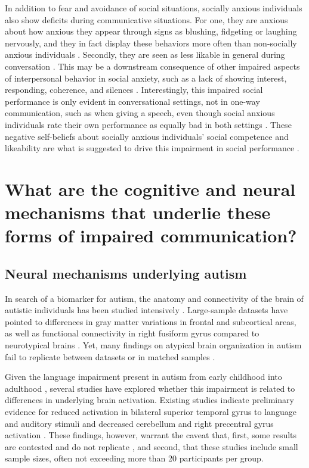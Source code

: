 In addition to fear and avoidance of social situations, socially anxious individuals also show deficits during communicative situations. For one, they are anxious about how anxious they appear through signs as blushing, fidgeting or laughing nervously, and they in fact display these behaviors more often than non-socially anxious individuals \citep{voncken2008JAD}. Secondly, they are seen as less likable in general during conversation \citep{alden1995,creed1998,meleshko1993,voncken2008BJCP}. This may be a downstream consequence of other impaired aspects of interpersonal behavior in social anxiety, such as a lack of showing interest, responding, coherence, and silences \citep{voncken2008JAD}. Interestingly, this impaired social performance is only evident in conversational settings, not in one-way communication, such as when giving a speech, even though social anxious individuals rate their own performance as equally bad in both settings \citep{voncken2008JAD}. These negative self-beliefs about socially anxious individuals' social competence and likeability are what is suggested to drive this impairment in social performance \citep{voncken2010}.

\section*{What are the cognitive and neural mechanisms that underlie these forms of impaired communication?}

\subsection*{Neural mechanisms underlying autism}

In search of a biomarker for autism, the anatomy and connectivity of the brain of autistic individuals has been studied intensively \citep[for a review]{pretzsch2022}. Large-sample datasets have pointed to differences in gray matter variations in frontal and subcortical areas, as well as functional connectivity in right fusiform gyrus compared to neurotypical brains \citep{mei2020,oblong2023}. Yet, many findings on atypical brain organization in autism fail to replicate between datasets or in matched samples \citep{he2020,koldewyn2014,mei2024,riddle2017}. 

Given the language impairment present in autism from early childhood into adulthood \citep{velikonja2019}, several studies have explored whether this impairment is related to differences in underlying brain activation. Existing studies indicate preliminary evidence for reduced activation in bilateral superior temporal gyrus to language and auditory stimuli and decreased cerebellum and right precentral gyrus activation \citep[for reviews]{groen2008,philip2012}. These findings, however, warrant the caveat that, first, some results are contested and do not replicate \citep{tryfon2018}, and second, that these studies include small sample sizes, often not exceeding more than 20 participants per group. 

